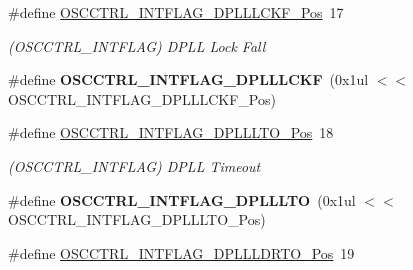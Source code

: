\begin{DoxyCompactItemize}
\item 
\hypertarget{group___s_a_m_l21___o_s_c_c_t_r_l_ga9cba0be810fe455156cdb13bb51846ca}{}\#define \hyperlink{group___s_a_m_l21___o_s_c_c_t_r_l_ga9cba0be810fe455156cdb13bb51846ca}{O\+S\+C\+C\+T\+R\+L\+\_\+\+I\+N\+T\+F\+L\+A\+G\+\_\+\+D\+P\+L\+L\+L\+C\+K\+F\+\_\+\+Pos}~17\label{group___s_a_m_l21___o_s_c_c_t_r_l_ga9cba0be810fe455156cdb13bb51846ca}

\begin{DoxyCompactList}\small\item\em (O\+S\+C\+C\+T\+R\+L\+\_\+\+I\+N\+T\+F\+L\+A\+G) D\+P\+L\+L Lock Fall \end{DoxyCompactList}\item 
\hypertarget{group___s_a_m_l21___o_s_c_c_t_r_l_gab0d2446d0095bfa4fd5721df199f4777}{}\#define {\bfseries O\+S\+C\+C\+T\+R\+L\+\_\+\+I\+N\+T\+F\+L\+A\+G\+\_\+\+D\+P\+L\+L\+L\+C\+K\+F}~(0x1ul $<$$<$ O\+S\+C\+C\+T\+R\+L\+\_\+\+I\+N\+T\+F\+L\+A\+G\+\_\+\+D\+P\+L\+L\+L\+C\+K\+F\+\_\+\+Pos)\label{group___s_a_m_l21___o_s_c_c_t_r_l_gab0d2446d0095bfa4fd5721df199f4777}

\item 
\hypertarget{group___s_a_m_l21___o_s_c_c_t_r_l_gadf574f200565845cfd644f55321dbbcf}{}\#define \hyperlink{group___s_a_m_l21___o_s_c_c_t_r_l_gadf574f200565845cfd644f55321dbbcf}{O\+S\+C\+C\+T\+R\+L\+\_\+\+I\+N\+T\+F\+L\+A\+G\+\_\+\+D\+P\+L\+L\+L\+T\+O\+\_\+\+Pos}~18\label{group___s_a_m_l21___o_s_c_c_t_r_l_gadf574f200565845cfd644f55321dbbcf}

\begin{DoxyCompactList}\small\item\em (O\+S\+C\+C\+T\+R\+L\+\_\+\+I\+N\+T\+F\+L\+A\+G) D\+P\+L\+L Timeout \end{DoxyCompactList}\item 
\hypertarget{group___s_a_m_l21___o_s_c_c_t_r_l_gaba29af287abc3383c557496901b4cbff}{}\#define {\bfseries O\+S\+C\+C\+T\+R\+L\+\_\+\+I\+N\+T\+F\+L\+A\+G\+\_\+\+D\+P\+L\+L\+L\+T\+O}~(0x1ul $<$$<$ O\+S\+C\+C\+T\+R\+L\+\_\+\+I\+N\+T\+F\+L\+A\+G\+\_\+\+D\+P\+L\+L\+L\+T\+O\+\_\+\+Pos)\label{group___s_a_m_l21___o_s_c_c_t_r_l_gaba29af287abc3383c557496901b4cbff}

\item 
\hypertarget{group___s_a_m_l21___o_s_c_c_t_r_l_ga09279358ecb890b756fea8627be32477}{}\#define \hyperlink{group___s_a_m_l21___o_s_c_c_t_r_l_ga09279358ecb890b756fea8627be32477}{O\+S\+C\+C\+T\+R\+L\+\_\+\+I\+N\+T\+F\+L\+A\+G\+\_\+\+D\+P\+L\+L\+L\+D\+R\+T\+O\+\_\+\+Pos}~19\label{group___s_a_m_l21___o_s_c_c_t_r_l_ga09279358ecb890b756fea8627be32477}


\end{DoxyCompactItemize}
